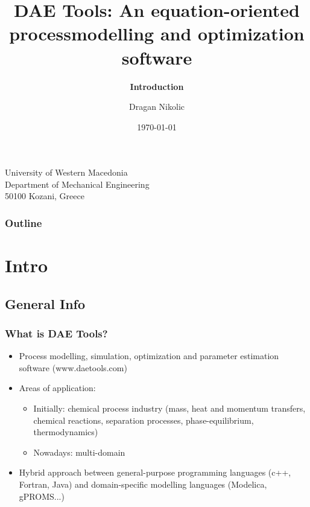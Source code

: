 \documentclass{beamer}
\begin{document}
\title[\textbf{DAE Tools} - Introduction]{\textbf{DAE Tools}: An equation-oriented process\linebreak modelling and optimization software}
\subtitle{\textbf{Introduction}}
\author{Dragan Nikolic}
\institute
{
  University of Western Macedonia\\
  Department of Mechanical Engineering\\
  50100 Kozani, Greece
}
\date{\today} 


\begin{frame}
\titlepage
\end{frame}

\begin{frame}
\frametitle{Outline}
\tableofcontents[currentsubsection, 
                 hideothersubsections, 
                 sectionstyle=show, 
                 subsectionstyle=hide]
\end{frame} 


\section{Intro}

\subsection{General Info}
\begin{frame}
\frametitle{What is DAE Tools?} 
\begin{itemize}
  \item Process modelling, simulation, optimization and parameter estimation software (www.daetools.com)
  \item Areas of application:
    \begin{itemize}
      \item Initially: chemical process industry (mass, heat and momentum transfers, chemical reactions, separation processes, phase-equilibrium, thermodynamics)
      \item Nowadays: multi-domain
    \end{itemize}
  \item Hybrid approach between general-purpose programming languages (c++, Fortran, Java) and domain-specific modelling languages (Modelica, gPROMS...)
\end{itemize}
\end{frame}
\end{document}
